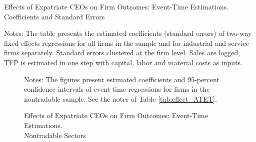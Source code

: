 \documentclass[12pt,a4paper]{article}
\begin{document}
\begin{singlespace}
\clearpage

\begin{table}[h]
\centering
    \caption{Effects of Expatriate CEOs on Firm Outcomes: Event-Time Estimations. \\  Coefficients and Standard Errors}
    \label{tab:dynamics_coeff}   
   
  \begin{minipage}{15.5cm}
  \vspace{.2cm}
  \footnotesize {Notes: The table presents the estimated coefficients (standard errors) of two-way fixed effects regressions for all firms in the sample and for industrial and service firms separately. Standard errors clustered at the firm level. Sales are logged, TFP is estimated in one step with capital, labor and material costs as inputs.}
\end{minipage}            
\end{table}


\clearpage

\begin{figure}[h]
    \centering
\begin{minipage}{14.5 cm}
    \caption{Effects of Expatriate CEOs on Firm Outcomes: Event-Time Estimations. \\ Nontradable Sectors}
   \label{fig:dynamics_nt}
Notes: The figures present estimated coefficients and 95-percent confidence intervals of  event-time regressions for firms in the nontradable sample. See the notes of Table \ref{tab:effect_ATET}. 
    \end{minipage}    
\end{figure}


\end{singlespace}
\end{document}
